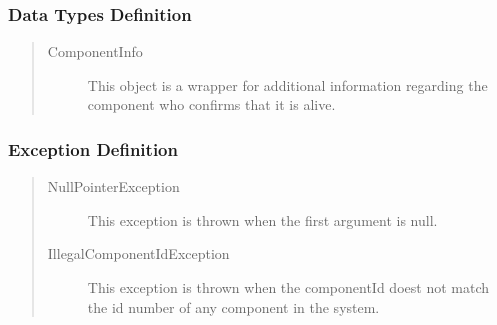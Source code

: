 \subsubsection{Data Types Definition}

\begin{quote}
	\begin{description}
		\item[ComponentInfo] This object is a wrapper for additional information
		regarding the component who confirms that it is alive.
	\end{description} 
\end{quote}

\subsubsection{Exception Definition} 

\begin{quote}
	\begin{description}
		\item[NullPointerException] This exception is thrown when the first argument
		is null. 
		\item[IllegalComponentIdException] This exception is thrown when the
		componentId doest not match the id number of any component in the system.
	\end{description} 
\end{quote}